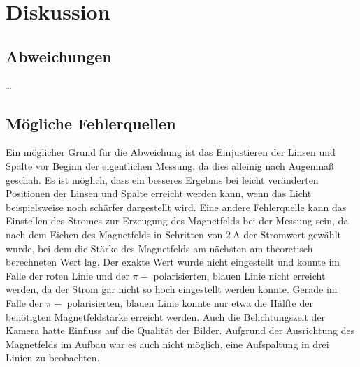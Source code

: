 \section{Diskussion}
\label{sec:diskussion}

\subsection{Abweichungen}

…


\subsection{Mögliche Fehlerquellen}

    Ein möglicher Grund für die Abweichung ist das Einjustieren der Linsen und Spalte vor Beginn der eigentlichen Messung,
    da dies alleinig nach Augenmaß geschah.
    Es ist möglich,
    dass ein besseres Ergebnis bei leicht veränderten Positionen der Linsen und Spalte erreicht werden kann,
    wenn das Licht beispielsweise noch schärfer dargestellt wird.
    Eine andere Fehlerquelle kann das Einstellen des Stromes zur Erzeugung des Magnetfelds bei der Messung sein,
    da nach dem Eichen des Magnetfelds in Schritten von $\SI{2}{\ampere}$ der Stromwert gewählt wurde,
    bei dem die Stärke des Magnetfelds am nächsten am theoretisch berechneten Wert lag.
    Der exakte Wert wurde nicht eingestellt und konnte im Falle der roten Linie und der $\pi-$ polarisierten,
    blauen Linie nicht erreicht werden,
    da der Strom gar nicht so hoch eingestellt werden konnte.
    Gerade im Falle der $\pi-$ polarisierten, blauen Linie konnte nur etwa die Hälfte der benötigten Magnetfeldstärke erreicht werden.
    Auch die Belichtungszeit der Kamera hatte Einfluss auf die Qualität der Bilder.
    Aufgrund der Ausrichtung des Magnetfelds im Aufbau war es auch nicht möglich,
    eine Aufspaltung in drei Linien zu beobachten.
